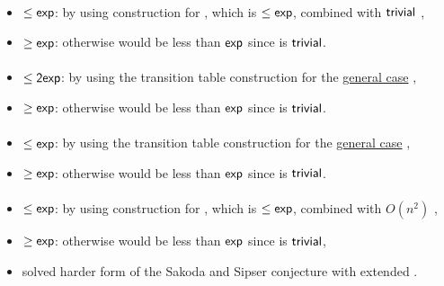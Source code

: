 \paragraph{\ODLA{}\tto\TDFA}\label{cost:1DLAto2DFAu}
\begin{itemize}
	\item $\le\mathsf{exp}$: by using construction for \hyperref[cost:1DLAto1DFAu]{\ODLA{}\tto\ODFA}, which is $\le\mathsf{exp}$, combined with $\mathsf{trivial}$ \ODFA{}\tto\TDFA,
	\item $\ge\mathsf{exp}$: otherwise \hyperref[cost:1DLAto2NFAu]{\ODLA{}\tto\TNFA} would be less than $\mathsf{exp}$ since \TDFA{}\tto\TNFA is $\mathsf{trivial}$.
\end{itemize}
\paragraph{\OLA{}\tto\ODFA}
\begin{itemize}
	\item $\le\mathsf{2exp}$: by using the transition table construction for the \hyperref[cost:1LAto1DFA]{general case} \cite{PigPis14},
	\item $\ge\mathsf{exp}$: otherwise \hyperref[cost:1DLAto1DFAu]{\ODLA{}\tto\ODFA} would be less than $\mathsf{exp}$ since \ODLA{}\tto\OLA is $\mathsf{trivial}$.
\end{itemize}
\paragraph{\OLA{}\tto\ONFA}\label{cost:1DLAto1NFAu}
\begin{itemize}
	\item $\le\mathsf{exp}$: by using the transition table construction for the \hyperref[cost:1LAto1NFA]{general case} \cite{PigPis14},
	\item $\ge\mathsf{exp}$: otherwise \hyperref[cost:1DLAto1NFAu]{\ODLA{}\tto\ONFA} would be less than $\mathsf{exp}$ since \ODLA{}\tto\OLA is $\mathsf{trivial}$.
\end{itemize}
\paragraph{\OLA{}\tto\TDFA}
\begin{itemize}
	\item $\le\mathsf{exp}$: by using construction for \hyperref[cost:1LAto1NFAu]{\OLA{}\tto\ONFA}, which is $\le\mathsf{exp}$, combined with $O(n^2)$ \hyperref[cost:1NFAto2DFAu]{\ONFA{}\tto\TDFA},
	\item $\ge\mathsf{exp}$: otherwise \hyperref[cost:1DLAto2DFAu]{\ODLA{}\tto\TDFA} would be less than $\mathsf{exp}$ since \ODLA{}\tto\OLA is $\mathsf{trivial}$,
	\item solved harder form of the Sakoda and Sipser conjecture with extended \TNFA.
\end{itemize}
